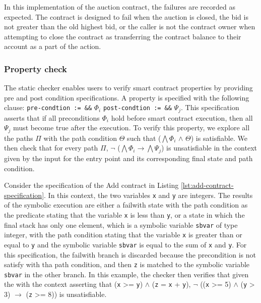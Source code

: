 \documentclass[a4paper,UKenglish,cleveref, autoref, thm-restate]{lipics-v2021}
\begin{document}
In this implementation of the auction contract, the failures are recorded as expected. The contract is designed to fail when the auction is closed, the bid is not greater than the old highest bid, or the caller is not the contract owner when attempting to close the contract as transferring the contract balance to their account as a part of the action.

\subsubsection{Property check}
The static checker enables users to verify smart contract properties by providing pre and post condition specifications. A property is specified with the following clause:  \lstinline/pre-condtion := &&/ $\Phi_{i}$ \lstinline/post-condtion := &&/ $\Psi_{j}$. This specification asserts that if all preconditions $\Phi_{i}$ hold before smart contract execution, then all $\Psi_{j}$ must become true after the execution. To verify this property, we explore all the paths $\Pi$ with the path condition $\Theta$ such that ($\bigwedge \Phi_{i}$ $\land$ $\Theta$) is satisfiable. We then check that for every path $\Pi$, $\neg$ ($\bigwedge \Phi_{i} \rightarrow \bigwedge \Psi_{j}$) is unsatisfiable in the context given by the input for the entry point and its corresponding final state and path condition.

Consider the specification of the Add contract in Listing \ref{lst:add-contract-specification}. In this context, the two variables \lstinline/x/ and \lstinline/y/ are integers. The results of the symbolic execution are either a failwith state with the path condition as the predicate stating that the variable \lstinline/x/ is less than \lstinline/y/, or a state in which the final stack has only one element, which is a symbolic variable \lstinline/sbvar/ of type integer, with the path condition stating that the variable \lstinline/x/ is greater than or equal to \lstinline/y/ and the symbolic variable \lstinline/sbvar/ is equal to the sum of \lstinline/x/ and \lstinline/y/. For this specification, the failwith branch is discarded because the precondition is not satisfy with tha path condition, and then \lstinline/z/ is matched to the symbolic variable \lstinline/sbvar/ in the other branch. In this example, the checker then verifies that given the with the context asserting that (\lstinline/x/ >= \lstinline/y/) $\land$ (\lstinline/z/ = \lstinline/x/ + \lstinline/y/), $\neg$ ((\lstinline/x/ >= 5) $\land$ (\lstinline/y/ > 3) $\rightarrow$ (\lstinline/z/ >= 8)) is unsatisfiable. 
\end{document}
